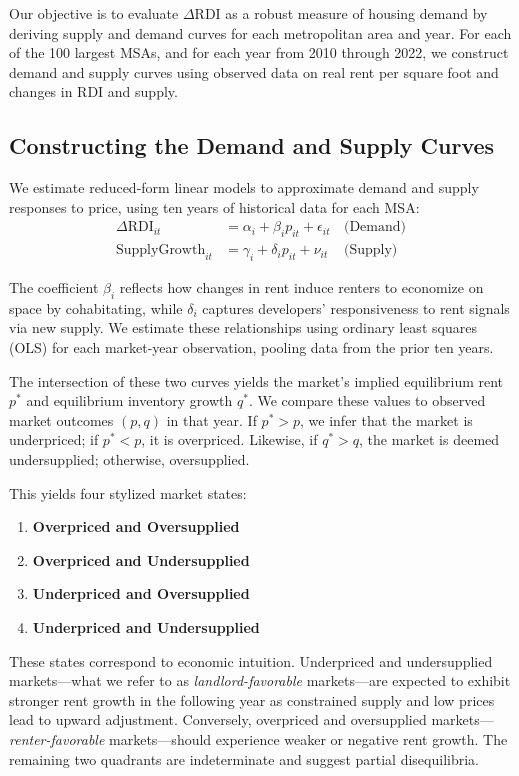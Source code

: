 \documentclass[sn-mathphys-num]{sn-jnl}%
\theoremstyle{thmstyleone}%
\theoremstyle{thmstyletwo}%
\theoremstyle{thmstylethree}%
\begin{document}
Our objective is to evaluate \( \Delta \text{RDI} \) as a robust measure of housing demand by deriving supply and demand curves for each metropolitan area and year. For each of the 100 largest MSAs, and for each year from 2010 through 2022, we construct demand and supply curves using observed data on real rent per square foot and changes in RDI and supply.

\subsection{Constructing the Demand and Supply Curves}

We estimate reduced-form linear models to approximate demand and supply responses to price, using ten years of historical data for each MSA:
\begin{align}
	\Delta \text{RDI}_{it} &= \alpha_i + \beta_i p_{it} + \epsilon_{it} \, &\text{(Demand)} \\
	\text{SupplyGrowth}_{it} &= \gamma_i + \delta_i p_{it} + \nu_{it} \, &\text{(Supply)}
\end{align}

The coefficient \( \beta_i \) reflects how changes in rent induce renters to economize on space by cohabitating, while \( \delta_i \) captures developers' responsiveness to rent signals via new supply. We estimate these relationships using ordinary least squares (OLS) for each market-year observation, pooling data from the prior ten years.

The intersection of these two curves yields the market's implied equilibrium rent \( p^* \) and equilibrium inventory growth \( q^* \). We compare these values to observed market outcomes \( (p, q) \) in that year. If \( p^* > p \), we infer that the market is underpriced; if \( p^* < p \), it is overpriced. Likewise, if \( q^* > q \), the market is deemed undersupplied; otherwise, oversupplied.

This yields four stylized market states:
\begin{enumerate}
	\item \textbf{Overpriced and Oversupplied}
	\item \textbf{Overpriced and Undersupplied}
	\item \textbf{Underpriced and Oversupplied}
	\item \textbf{Underpriced and Undersupplied}
\end{enumerate}

These states correspond to economic intuition. Underpriced and undersupplied markets---what we refer to as \textit{landlord-favorable} markets---are expected to exhibit stronger rent growth in the following year as constrained supply and low prices lead to upward adjustment. Conversely, overpriced and oversupplied markets---\textit{renter-favorable} markets---should experience weaker or negative rent growth. The remaining two quadrants are indeterminate and suggest partial disequilibria.
\end{document}
